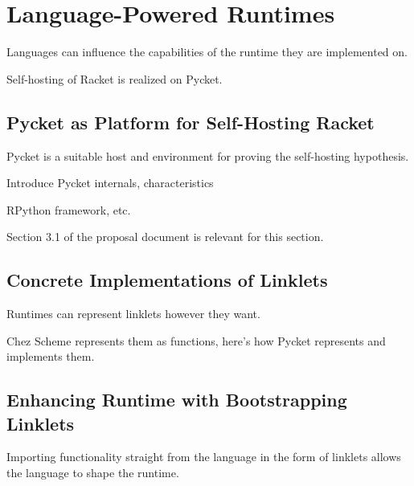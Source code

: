 \chapter{Language-Powered Runtimes}
	\begin{chapterpoint}
		Languages can influence the capabilities of the runtime they are implemented on.

		Self-hosting of Racket is realized on Pycket.

	\end{chapterpoint}

	\section{Pycket as Platform for Self-Hosting Racket}

		\label{section:language-powered-runtimes:pycket-as-platform}

		\begin{mainpoint}
			Pycket is a suitable host and environment for proving the self-hosting hypothesis.
		\end{mainpoint}

		\begin{todo}[TODO]
			Introduce Pycket internals, characteristics

			RPython framework, etc.
		\end{todo}

		\begin{todo}[Import]
				Section 3.1 of the proposal document is relevant for this section.
		\end{todo}

	\section{Concrete Implementations of Linklets}

		\begin{mainpoint}
			Runtimes can represent linklets however they want.

			Chez Scheme represents them as functions, here's how Pycket represents and implements them.
		\end{mainpoint}

	\section{Enhancing Runtime with Bootstrapping Linklets}
		\begin{mainpoint}
			Importing functionality straight from the language in the form of linklets allows the language to shape the runtime.
		\end{mainpoint}
